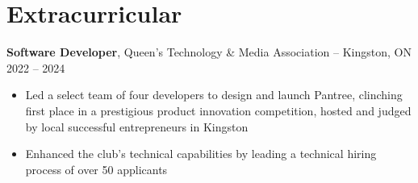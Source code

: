 

\section*{Extracurricular}
\textbf{Software Developer}, {Queen's Technology \& Media Association} -- Kingston, ON \hfill 2022 -- 2024 \\
\vspace{-5pt}
\begin{itemize}
  \item Led a select team of four developers to design and launch Pantree, clinching first place in a prestigious product innovation competition, hosted and judged by local successful entrepreneurs in Kingston
  \item Enhanced the club's technical capabilities by leading a technical hiring process of over 50 applicants
\end{itemize}

